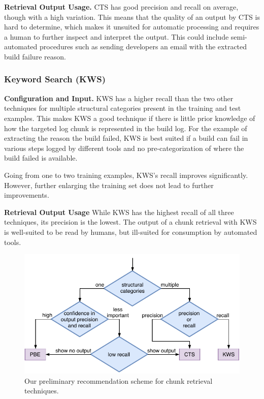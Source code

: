\noindent
\textbf{Retrieval Output Usage.}
CTS has good precision and recall on average, though with a high
variation.
This means that the quality of an output by CTS is hard to
determine, which makes it unsuited for automatic processing and requires
a human to further inspect and interpret the output.
This could include semi-automated procedures such as sending
developers an email with the extracted build failure reason.

\subsubsection{Keyword Search (KWS)}
\noindent
\textbf{Configuration and Input.}
KWS has a higher recall than the two other techniques for multiple
structural categories present in the training and test examples.
This
makes KWS a good technique if there is little prior knowledge of how
the targeted log chunk is represented in the build log.
For the
example of extracting the reason the build failed, KWS is best suited
if a build can fail in various steps logged by different tools and no
pre-categorization of where the build failed is available.

Going from one to two training examples, KWS's recall improves
significantly.
However, further enlarging the training set
does not lead to further improvements.

\noindent
\textbf{Retrieval Output Usage}
While KWS has the highest recall of all three techniques, its
precision is the lowest.
The output of a chunk retrieval with KWS is
well-suited to be read by humans, but ill-suited for consumption by
automated tools.

\begin{figure}[tb]
		\centering
		\includegraphics[width=\columnwidth,
		clip]{img/crt-recommendation.pdf}
		\caption{Our preliminary recommendation scheme for chunk
		retrieval techniques.}
		\label{fig:crt-recommendation}
\end{figure}

